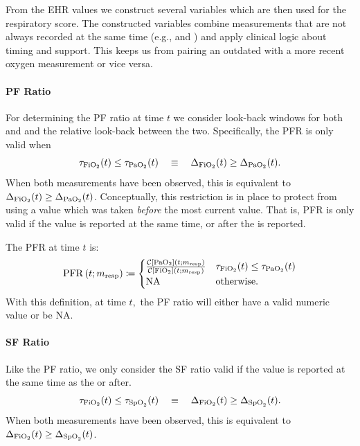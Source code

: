 \documentclass[letterpaper,10pt]{article}
\begin{document}
From the EHR values we construct several variables which are then used
for the respiratory score. The constructed variables combine
measurements that are not always recorded at the same time (e.g.,
\spotwo and \fiotwo) and apply clinical logic about timing and
support. This keeps us from pairing an outdated \fiotwo with a more
recent oxygen measurement or vice versa.

\paragraph{PF Ratio}
For determining the PF ratio at time $t$ we consider look-back windows for
both \fiotwo and \paotwo and the relative look-back between the two.
Specifically, the PFR is only valid when
\begin{equation}
  \label{eq:pfr-validity}
  \tau_{\mathrm{FiO}_{2}}(t) \leq \tau_{\mathrm{PaO}_{2}}(t) \quad \equiv \quad
  \Delta_{\mathrm{FiO}_{2}}(t) \geq \Delta_{\mathrm{PaO}_{2}}(t).
\end{equation}
When both measurements have been observed, this is equivalent to
$\Delta_{\mathrm{FiO}_{2}}(t) \geq \Delta_{\mathrm{PaO}_{2}}(t)$.
Conceptually, this restriction is in place to protect from using a
\paotwo value which was taken \emph{before} the most current \fiotwo
value. That is, PFR is only valid if the \paotwo value is reported at
the same time, or after the \fiotwo is reported.

The PFR at time $t$ is:
\begin{equation}
  \label{eq:pfr}
  \mathrm{PFR}\left(t; m_{\mathrm{resp}}\right) \coloneqq
    \begin{cases}
      \frac{\mathcal{C}\left[\mathrm{PaO}_{2}\right]\left(t;m_{\mathrm{resp}}\right)}{\mathcal{C}\left[\mathrm{FiO}_{2}\right]\left(t;m_{\mathrm{resp}}\right)}
      & \tau_{\mathrm{FiO}_{2}}(t) \leq \tau_{\mathrm{PaO}_{2}}(t) \\
      \mathrm{NA} & \text{otherwise.}
    \end{cases}
\end{equation}
With this definition, at time $t,$ the PF ratio will either have a
valid numeric value or be $\mathrm{NA}.$

\paragraph{SF Ratio}
Like the PF ratio, we only consider the SF ratio valid if the \spotwo
value is reported at the same time as the \fiotwo or after.
\begin{equation}
  \label{eq:sfr-validity}
  \tau_{\mathrm{FiO}_{2}}(t) \leq \tau_{\mathrm{SpO}_{2}}(t) \quad \equiv \quad
  \Delta_{\mathrm{FiO}_{2}}(t) \geq \Delta_{\mathrm{SpO}_{2}}(t).
\end{equation}
When both measurements have been observed, this is equivalent to
$\Delta_{\mathrm{FiO}_{2}}(t) \geq \Delta_{\mathrm{SpO}_{2}}(t)$.
\end{document}
